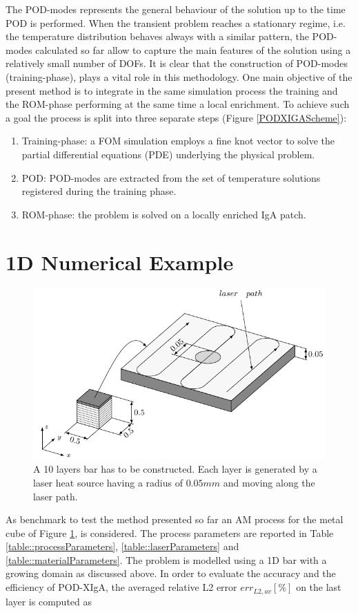 \documentclass[3p]{article}
\begin{document}
 The POD-modes represents the general behaviour of the solution up to the time POD is performed. When the transient problem reaches a stationary regime, i.e. the temperature distribution behaves always with a similar pattern, the POD-modes calculated so far allow to capture the main features of the solution using a relatively small number of DOFs. It is clear that the construction of POD-modes (training-phase), plays a vital role in this methodology. One main objective of the present method is to integrate in the same simulation process the training and the ROM-phase performing at the same time a local enrichment. To achieve such a goal the process is split into three separate steps (Figure \ref{PODXIGAScheme}):
\begin{enumerate}
\item Training-phase: a FOM simulation employs a fine knot vector to solve the partial differential equations (PDE) underlying the physical problem.
\item POD: POD-modes are extracted from the set of temperature solutions registered during the training phase.
\item ROM-phase: the problem is solved on a locally enriched IgA patch.
\end{enumerate}


\section*{1D Numerical Example}
\begin{figure}
\includegraphics[width=\linewidth]{externals/Pictures/PODXIGABenchmarkBAR.pdf}
\caption{A 10 layers bar has to be constructed. Each layer is generated by a laser heat source having a radius of $0.05mm$ and moving along the laser path.}
\label{PODXIGABenchmark}
\end{figure}
As benchmark to test the method presented so far an AM process for the metal cube of Figure \ref{PODXIGABenchmark}, is considered. The process parameters are reported in Table \ref{table::processParameters}, \ref{table::laserParameters} and \ref{table::materialParameters}. The problem is modelled using a 1D bar with a growing domain as discussed above.
In order to evaluate the accuracy and the efficiency of POD-XIgA, the averaged relative L2 error $err_{L2,av}\left[\%\right]$ on the last layer is computed as
\end{document}
